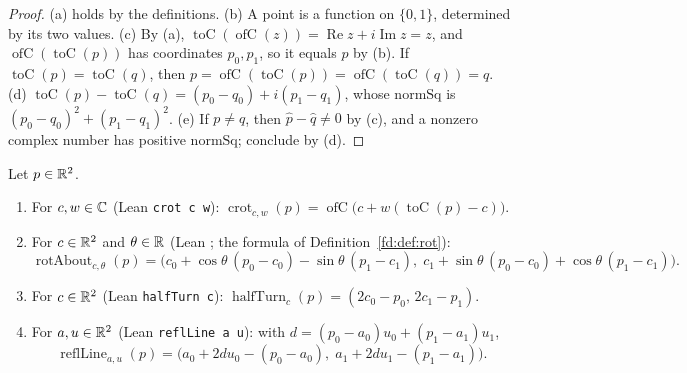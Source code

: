 \begin{proof}
(a) holds by the definitions. (b) A point is a function on $\{0,1\}$, determined by its two values. (c) By (a),
$\operatorname{toC}(\operatorname{ofC}(z))=\operatorname{Re}z+i\operatorname{Im}z=z$, and
$\operatorname{ofC}(\operatorname{toC}(p))$ has coordinates $p_0,p_1$, so it equals $p$ by (b). If
$\operatorname{toC}(p)=\operatorname{toC}(q)$, then $p=\operatorname{ofC}(\operatorname{toC}(p))=
\operatorname{ofC}(\operatorname{toC}(q))=q$. (d) $\operatorname{toC}(p)-\operatorname{toC}(q)=(p_0-q_0)+i(p_1-q_1)$,
whose $\mathrm{normSq}$ is $(p_0-q_0)^2+(p_1-q_1)^2$. (e) If $p\ne q$, then $\hat p-\hat q\ne0$ by (c), and a nonzero
complex number has positive $\mathrm{normSq}$; conclude by (d).
\end{proof}

\begin{definition}\label{sr:def:maps}
Let $p\in\mathbb R^2$.
\begin{enumerate}[label=(\alph*)]
\item For $c,w\in\mathbb C$ (Lean \texttt{crot c w}):
  $\operatorname{crot}_{c,w}(p)=\operatorname{ofC}\bigl(c+w(\operatorname{toC}(p)-c)\bigr)$.
\item For $c\in\mathbb R^2$ and $\theta\in\mathbb R$ (Lean ; the formula of Definition~\ref{fd:def:rot}):
  \[
  \operatorname{rotAbout}_{c,\theta}(p)=\bigl(c_0+\cos\theta\,(p_0-c_0)-\sin\theta\,(p_1-c_1),\;
  c_1+\sin\theta\,(p_0-c_0)+\cos\theta\,(p_1-c_1)\bigr).
  \]
\item For $c\in\mathbb R^2$ (Lean \texttt{halfTurn c}): $\operatorname{halfTurn}_c(p)=(2c_0-p_0,\,2c_1-p_1)$.
\item For $a,u\in\mathbb R^2$ (Lean \texttt{reflLine a u}): with $d=(p_0-a_0)u_0+(p_1-a_1)u_1$,
  \[
  \operatorname{reflLine}_{a,u}(p)=\bigl(a_0+2du_0-(p_0-a_0),\;a_1+2du_1-(p_1-a_1)\bigr).
  \]
\end{enumerate}
\end{definition}

